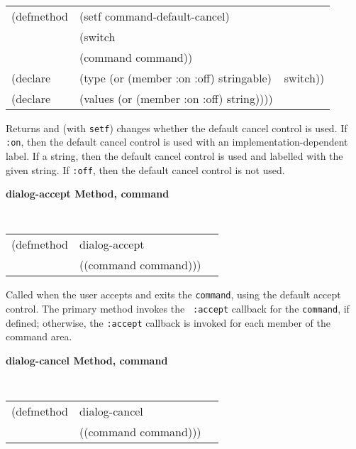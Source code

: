 {\samepage
\begin{flushright} \parbox[t]{6.125in}{
\tt
\begin{tabular}{lll}
\raggedright
(defmethod & (setf command-default-cancel) & \\
         & (switch \\
         & (command command)) \\
(declare &(type (or (member :on :off) stringable) & switch))\\
(declare &(values (or (member :on :off) string))))
\end{tabular}
\rm
}
\end{flushright}}



\begin{flushright} \parbox[t]{6.125in}{
Returns and (with {\tt setf}) changes whether the default cancel control is
used. If {\tt :on}, then the default cancel control is used with an
implementation-dependent label. If a string, then the default cancel control
is used and labelled with the given string. If {\tt :off}, then the default
cancel control is not used.

}\end{flushright}



{\samepage
{\large {\bf dialog-accept \hfill Method, command}}
\begin{flushright} \parbox[t]{6.125in}{
\tt
\begin{tabular}{lll}
\raggedright
(defmethod & dialog-accept & \\
& ((command  command)))
\end{tabular}
\rm

}\end{flushright}}


\begin{flushright} \parbox[t]{6.125in}{Called when the user accepts and exits the
{\tt command}, using the default accept control. The primary method invokes the {\tt
:accept} callback
for the {\tt command}, if defined; otherwise, the {\tt :accept} callback is invoked
for each member of the command area.  }\end{flushright}



{\samepage
{\large {\bf dialog-cancel \hfill Method, command}}
\begin{flushright} \parbox[t]{6.125in}{
\tt
\begin{tabular}{lll}
\raggedright
(defmethod & dialog-cancel & \\
& ((command  command)))
\end{tabular}
\rm

}\end{flushright}}


